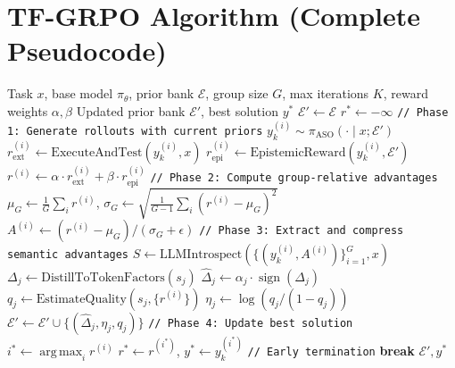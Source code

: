 \documentclass[11pt]{article}
\DeclareMathOperator*{\argmax}{arg\,max}
\DeclareMathOperator{\sign}{sign}
\begin{document}
\appendix

\section{TF-GRPO Algorithm (Complete Pseudocode)}
\label{app:algorithm}

\begin{algorithm}[H]
\caption{Training-Free GRPO with PoE Decoding}
\label{alg:tfgrpo}
\begin{algorithmic}[1]
\Require Task $x$, base model $\pi_\theta$, prior bank $\mathcal{E}$,
         group size $G$, max iterations $K$, reward weights $\alpha, \beta$
\Ensure Updated prior bank $\mathcal{E}'$, best solution $y^*$
\State $\mathcal{E}' \gets \mathcal{E}$
\State $r^* \gets -\infty$
    \State \texttt{// Phase 1: Generate rollouts with current priors}
        \State $y^{(i)}_k \sim \pi_{\text{ASO}}(\cdot \mid x; \mathcal{E}')$
        \State $r_{\text{ext}}^{(i)} \gets \text{ExecuteAndTest}(y^{(i)}_k, x)$
        \State $r_{\text{epi}}^{(i)} \gets \text{EpistemicReward}(y^{(i)}_k, \mathcal{E}')$
        \State $r^{(i)} \gets \alpha \cdot r_{\text{ext}}^{(i)} + \beta \cdot r_{\text{epi}}^{(i)}$
    \EndFor
    \State \texttt{// Phase 2: Compute group-relative advantages}
    \State $\mu_G \gets \frac{1}{G}\sum_i r^{(i)}$, \quad
           $\sigma_G \gets \sqrt{\frac{1}{G-1}\sum_i (r^{(i)} - \mu_G)^2}$
        \State $A^{(i)} \gets (r^{(i)} - \mu_G) / (\sigma_G + \epsilon)$
    \EndFor
    \State \texttt{// Phase 3: Extract and compress semantic advantages}
    \State $S \gets \text{LLMIntrospect}(\{(y^{(i)}_k, A^{(i)})\}_{i=1}^G, x)$
        \State $\Delta_j \gets \text{DistillToTokenFactors}(s_j)$
        \State $\widehat{\Delta}_j \gets \alpha_j \cdot \sign(\Delta_j)$
        \State $q_j \gets \text{EstimateQuality}(s_j, \{r^{(i)}\})$
        \State $\eta_j \gets \log(q_j / (1 - q_j))$
        \State $\mathcal{E}' \gets \mathcal{E}' \cup \{(\widehat{\Delta}_j, \eta_j, q_j)\}$
    \EndFor
    \State \texttt{// Phase 4: Update best solution}
    \State $i^* \gets \argmax_i r^{(i)}$
        \State $r^* \gets r^{(i^*)}$, \quad $y^* \gets y^{(i^*)}_k$
    \EndIf
    \State \texttt{// Early termination}
        \State \textbf{break} 
    \EndIf
\EndFor
\State \Return $\mathcal{E}', y^*$
\end{algorithmic}
\end{algorithm}
\end{document}
